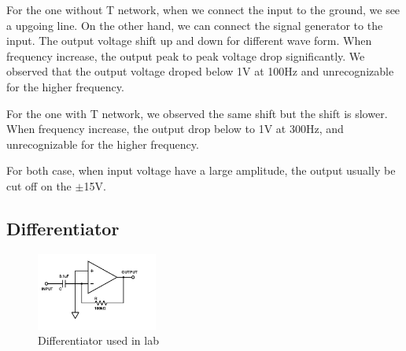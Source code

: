 \documentclass[aps,prl,reprint]{revtex4-1}
\begin{document}
        For the one without T network, when we connect the input to the ground, we see a upgoing line. On the other hand, we can connect the signal generator to the input. The output voltage shift up and down for different wave form. When frequency increase, the output peak to peak voltage drop significantly. We observed that the output voltage droped below 1V at 100Hz and unrecognizable for the higher frequency.

        For the one with T network, we observed the same shift but the shift is slower. When frequency increase, the output drop below to 1V at 300Hz, and unrecognizable for the higher frequency.

        For both case, when input voltage have a large amplitude, the output usually be cut off on the $\pm$15V.
    \subsection{Differentiator}
        \begin{figure}[h]
            \centering
            \includegraphics[height=1in]{image/differentiator/Differentiator-Lab.pdf}
            \caption{Differentiator used in lab}
            \label{fig:differentiatorLab}
        \end{figure}{}
\end{document}
